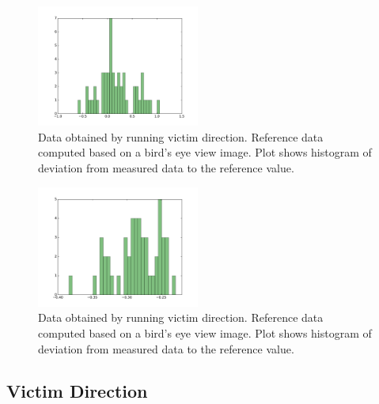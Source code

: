 \documentclass[a4paper,parskip,headheight=38pt]{scrartcl} %
\begin{document}
\begin{figure}[t]
\includegraphics[width=\textwidth, height=4cm]{victimdirectionbadplot.pdf}
\caption{Data obtained by running victim direction. Reference data computed
based on a bird's eye view image. Plot shows histogram of deviation from
measured data to the reference value.}
\label{fig:vddatabad}
\end{figure}
\begin{figure}[t]
\includegraphics[width=\textwidth, height=4cm]{victimdirectiongoodplot.pdf}
\caption{Data obtained by running victim direction. Reference data computed
based on a bird's eye view image. Plot shows histogram of deviation from
measured data to the reference value.}
\label{fig:vddatagood}
\end{figure}

\subsection{Victim Direction}
\end{document}
